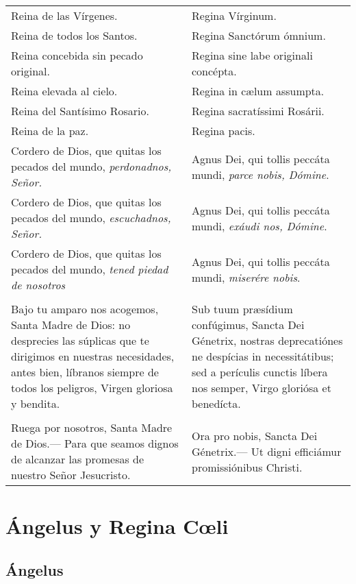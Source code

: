 \documentclass[11pt,a4paper]{book}
\begin{document}
\begin{longtable} { p{} p{} }
        Reina de las Vírgenes. & Regina Vírginum.\\
        Reina de todos los Santos. & Regina Sanctórum ómnium.\\
        Reina concebida sin pecado original. & Regina sine labe originali concépta.\\
        Reina elevada al cielo. & Regina in cælum assumpta.\\
        Reina del Santísimo Rosario. & Regina sa­cra­tíssimi Rosárii.\\
        Reina de la paz. & Regina pacis.\\
        Cordero de Dios, que quitas los pecados del mundo, \emph{perdonadnos, Señor.} &
        Agnus Dei, qui tollis peccáta mundi, \emph{parce nobis, Dómine}.\\
        Cordero de Dios, que quitas los pecados del mundo, \emph{escuchadnos, Señor.} &
        Agnus Dei, qui tollis peccáta mundi, \emph{exáudi nos, Dómine}.\\
        Cordero de Dios, que quitas los pecados del mundo, \emph{tened piedad de nosotros} &
        Agnus Dei, qui tollis peccáta mundi, \emph{miserére nobis}.\\\\
        Bajo tu amparo nos acogemos, Santa Madre de Dios: no desprecies las súplicas que te dirigimos en nuestras necesidades, 
        antes bien, líbranos siempre de todos los peligros, Virgen gloriosa y bendita. &
        Sub tuum præsídium confúgimus, Sancta Dei Génetrix, nostras de­pre­ca­tiónes ne despícias in ne­ces­si­tátibus; 
        sed a perículis cunctis líbera nos semper, Virgo gloriósa et benedícta.\\\\
        Ruega por nosotros, Santa Madre de Dios.--- Para que seamos dignos de alcanzar las promesas de nuestro Señor Jesucristo. &
        Ora pro nobis, Sancta Dei Génetrix.--- Ut digni efficiámur pro­mi­ssiónibus Christi.
        
    \end{longtable}

    \chapter*{Ángelus y Regina Cœli}

    \section*{Ángelus}
\end{document}
